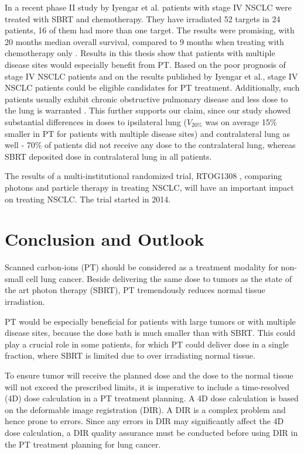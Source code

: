 \documentclass[type=dr, dr=rernat, accentcolor=tud7b,colorbacktitle, bigchapter, openright, twoside, 12pt ]{tudthesis}
\begin{document}
In a recent phase II study by Iyengar et al. \cite{Iyengar2014} patients with stage IV NSCLC were treated with SBRT and chemotherapy. 
They have irradiated 52 targets in 24 patients, 16 of them had more than one target. The results were promising, with 20 months median overall survival, 
compared to 9 months when treating with chemotherapy only \cite{Tsao2008}. Results in this thesis show that patients with multiple disease sites 
would especially benefit from PT. Based on the poor prognosis of stage IV NSCLC patients and on the results published by Iyengar et al.,
stage IV NSCLC patients could be eligible candidates for PT treatment. Additionally, such patients usually exhibit chronic obstructive pulmonary disease and 
less dose to the lung is warranted \cite{Westover2012}. This further supports our claim, since our study showed substantial differences in 
doses to ipsilateral lung ($V_{20\%}$ was on average 15\% smaller in PT for patients with multiple disease sites) and 
contralateral lung as well - 70\% of patients did not receive any dose to the contralateral lung, whereas SBRT deposited dose in contralateral lung in all patients.

The results of a multi-institutional randomized trial, RTOG1308 \cite{RTOG1308}, comparing photons and particle therapy in treating NSCLC,
will have an important impact on treating NSCLC. The trial started in 2014.


\chapter{Conclusion and Outlook}

Scanned carbon-ions (PT) should be considered as a treatment modality for non-small cell lung cancer. Beside delivering 
the same dose to tumors as the state of the art photon therapy (SBRT), PT tremendously reduces normal tissue irradiation.


PT would be especially beneficial for patients with large tumors or with multiple disease sites, because the dose bath is much
smaller than with SBRT. This could play a crucial role in some patients, for which PT could deliver dose in a single fraction, where SBRT is limited due to over 
irradiating normal tissue.



To ensure tumor will receive the planned dose and the dose to the normal tissue will not exceed the prescribed limits, it is imperative
to include a time-resolved (4D) dose calculation in a PT treatment planning. A 4D dose calculation is based on the deformable image registration (DIR).
A DIR is a complex problem and hence prone to errors. Since any errors in DIR may significantly affect the 4D dose calculation, a DIR
quality assurance must be conducted before using DIR in the PT treatment planning for lung cancer.
\end{document}
